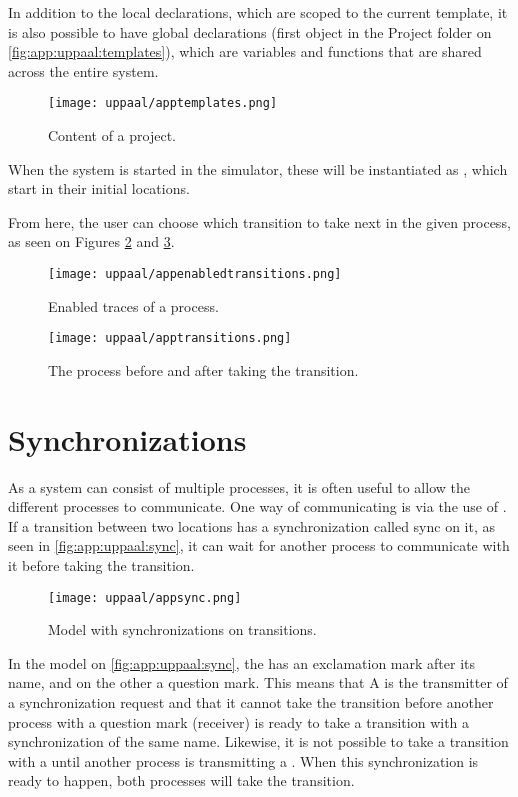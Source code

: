 In addition to the local declarations, which are scoped to the current template, it is also possible to have global declarations (first object in the Project folder on \autoref{fig:app:uppaal:templates}), which are variables and functions that are shared across the entire system.

\begin{figure}[H]
    \centering
    \texttt{[image: uppaal/apptemplates.png]}
    \caption{Content of a \uppaal project.}
    \label{fig:app:uppaal:templates}
\end{figure}
\noindent
When the system is started in the simulator, these  will be instantiated as , which start in their initial locations.

From here, the user can choose which transition to take next in the given process, as seen on Figures \ref{fig:app:uppaal:enabledtransitions} and \ref{fig:app:uppaal:transitions}.

\begin{figure}[H]
    \centering
    \texttt{[image: uppaal/appenabledtransitions.png]}
    \caption{Enabled traces of a process.}
    \label{fig:app:uppaal:enabledtransitions}
\end{figure}

\begin{figure}[H]
    \centering
    \texttt{[image: uppaal/apptransitions.png]}
    \caption{The process before and after taking the transition.}
    \label{fig:app:uppaal:transitions}
\end{figure}

\section*{Synchronizations}
As a \uppaal system can consist of multiple processes, it is often useful to allow the different processes to communicate.
One way of communicating is via the use of .
If a transition between two locations has a synchronization called sync on it, as seen in \autoref{fig:app:uppaal:sync}, it can wait for another process to communicate with it before taking the transition.

\begin{figure}[H]
    \centering
    \texttt{[image: uppaal/appsync.png]}
    \caption{Model with synchronizations on transitions.}
    \label{fig:app:uppaal:sync}
\end{figure}
\noindent
In the model on \autoref{fig:app:uppaal:sync}, the  has an exclamation mark after its name, and on the other a question mark.
This means that A is the transmitter of a synchronization request and that it cannot take the transition before another process with a question mark (receiver) is ready to take a transition with a synchronization of the same name.
Likewise, it is not possible to take a transition with a  until another process is transmitting a .
When this synchronization is ready to happen, both processes will take the transition.

